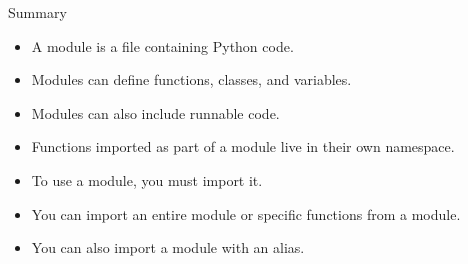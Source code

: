 \begin{frame}{Summary}
    \begin{itemize}
        \item A module is a file containing Python code.
        \item Modules can define functions, classes, and variables.
        \item Modules can also include runnable code.
        \item Functions imported as part of a module live in their own namespace.
        \item To use a module, you must import it.
        \item You can import an entire module or specific functions from a module.
        \item You can also import a module with an alias.
    \end{itemize}
\end{frame}
